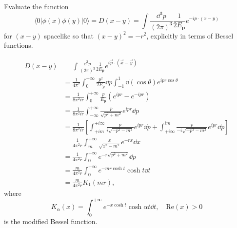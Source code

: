 \problem Evaluate the function
\begin{equation*}
    \langle 0 | \phi(x) \phi(y) |0 \rangle = D(x - y) = \int \frac{\dd^3p}{(2\pi)^3} \frac{1}{2E_\mathbf{p}} e^{-ip \cdot (x - y)}
\end{equation*}
for $(x - y)$ spacelike so that $(x - y)^2 = -r^2$, explicitly in terms of Bessel functions.

\solution
\begin{align*}
    D(x - y) & = \int \frac{\dd^3p}{(2\pi)^3} \frac{1}{2E_{\mathbf{p}}} e^{i\vec{p}\cdot(\vec{x} - \vec{y})}\\
    & = \frac{1}{4\pi^2} \int_0^{+\infty} \frac{p^2}{2E_{\mathbf{p}}} \dd p \int_{-1}^1 \dd (\cos\theta) e^{ipr\cos\theta}\\
    & = \frac{1}{8\pi^2ir} \int_0^{+\infty} \frac{p}{E_{\mathbf{p}}} \left(e^{ipr} - e^{-ipr}\right)\\
    & = \frac{1}{8\pi^2ir} \int_{-\infty}^{+\infty} \frac{p}{\sqrt{p^2 + m^2}} e^{ipr} \dd p\\
    & = \frac{1}{8\pi^2ir} \left[\int_{+im}^{+i\infty} \frac{p}{i\sqrt{-p^2 - m^2}} e^{ipr} \dd p + \int_{+i\infty}^{im} \frac{p}{-i\sqrt{-p^2 - m^2}} e^{ipr} \dd p \right]\\
    & = \frac{1}{4\pi^2r} \int_m^{+\infty} \frac{x}{\sqrt{x^2 - m^2}} e^{-rx} \dd x\\
    & = \frac{1}{4\pi^2r} \int_0^{+\infty} e^{-r\sqrt{p^2 + m^2}} \dd p\\
    & = \frac{m}{4\pi^2r} \int_0^{+\infty} e^{-mr\cosh t} \cosh t \dd t\\
    & = \frac{m}{4\pi^2r} K_1(mr),
\end{align*}
where 
\begin{equation*}
    K_\alpha(x) = \int_0^{+\infty} e^{-x\cosh t} \cosh{\alpha t} \dd t, \quad \mathrm{Re}(x) > 0
\end{equation*}
is the modified Bessel function.